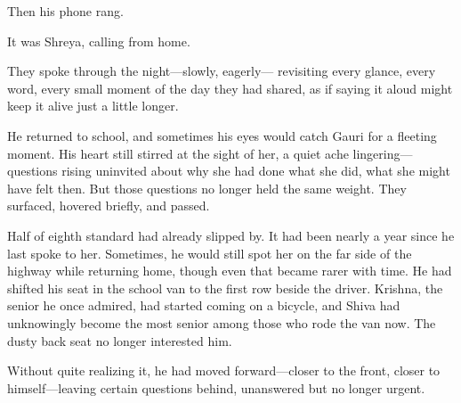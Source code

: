 Then his phone rang.

It was Shreya, calling from home.

They spoke through the night—slowly, eagerly— revisiting every glance, every word, every small moment of the day they had shared, as if saying it aloud might keep it alive just a little longer.

He returned to school, and sometimes his eyes would catch Gauri for a fleeting moment. His heart still stirred at the sight of her, a quiet ache lingering—questions rising uninvited about why she had done what she did, what she might have felt then. But those questions no longer held the same weight. They surfaced, hovered briefly, and passed.

Half of eighth standard had already slipped by. It had been nearly a year since he last spoke to her. Sometimes, he would still spot her on the far side of the highway while returning home, though even that became rarer with time. He had shifted his seat in the school van to the first row beside the driver. Krishna, the senior he once admired, had started coming on a bicycle, and Shiva had unknowingly become the most senior among those who rode the van now. The dusty back seat no longer interested him.

Without quite realizing it, he had moved forward—closer to the front, closer to himself—leaving certain questions behind, unanswered but no longer urgent.